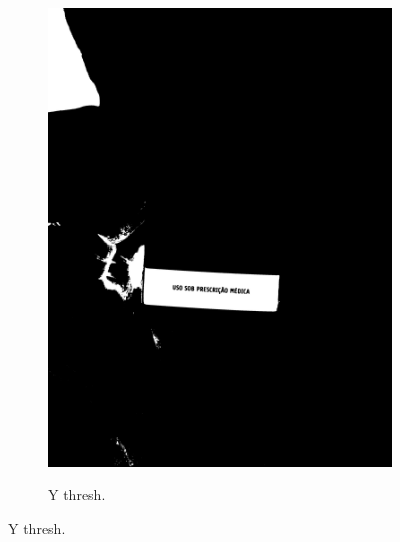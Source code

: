 \begin{figure}[htb]
\begin{subfigure}[t]{0.21\textwidth}
        \includegraphics[width=\linewidth]{../pictures/tysabri_cmyk_m_only_thresh.jpg}
    \end{subfigure}
    \hfill
    \begin{subfigure}[t]{0.21\textwidth}
        \centering
        \caption{Y thresh.}
        \label{fig:foto:versoes:2:Y_thresh}

\end{subfigure}
\end{figure}
